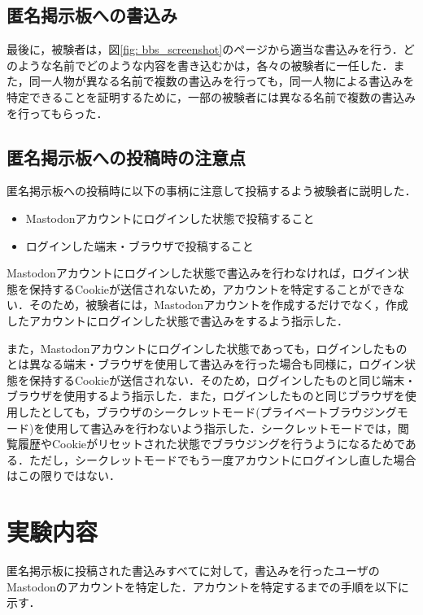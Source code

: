 \documentclass[10pt, a4paper]{jreport}
\begin{document}
\subsection{匿名掲示板への書込み}
最後に，被験者は，図\ref{fig: bbs_screenshot}のページから適当な書込みを行う．どのような名前でどのような内容を書き込むかは，各々の被験者に一任した．また，同一人物が異なる名前で複数の書込みを行っても，同一人物による書込みを特定できることを証明するために，一部の被験者には異なる名前で複数の書込みを行ってもらった．

\subsection{匿名掲示板への投稿時の注意点}
匿名掲示板への投稿時に以下の事柄に注意して投稿するよう被験者に説明した．

\begin{itemize}
\item{Mastodonアカウントにログインした状態で投稿すること}
\item{ログインした端末・ブラウザで投稿すること}
\end{itemize}

Mastodonアカウントにログインした状態で書込みを行わなければ，ログイン状態を保持するCookieが送信されないため，アカウントを特定することができない．そのため，被験者には，Mastodonアカウントを作成するだけでなく，作成したアカウントにログインした状態で書込みをするよう指示した．

また，Mastodonアカウントにログインした状態であっても，ログインしたものとは異なる端末・ブラウザを使用して書込みを行った場合も同様に，ログイン状態を保持するCookieが送信されない．そのため，ログインしたものと同じ端末・ブラウザを使用するよう指示した．また，ログインしたものと同じブラウザを使用したとしても，ブラウザのシークレットモード(プライベートブラウジングモード)を使用して書込みを行わないよう指示した．シークレットモードでは，閲覧履歴やCookieがリセットされた状態でブラウジングを行うようになるためである．ただし，シークレットモードでもう一度アカウントにログインし直した場合はこの限りではない．

\section{実験内容}\label{sec: exp_flow}
匿名掲示板に投稿された書込みすべてに対して，書込みを行ったユーザのMastodonのアカウントを特定した．アカウントを特定するまでの手順を以下に示す．
\end{document}
